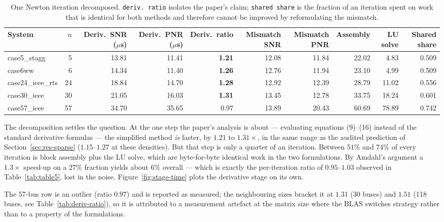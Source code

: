 \documentclass[sigconf,nonacm]{acmart}
\begin{document}
\begin{table}[t]
\centering
\caption{One Newton iteration decomposed. \texttt{deriv.\ ratio} isolates the
paper's claim; \texttt{shared share} is the fraction of an iteration spent on
work that is identical for both methods and therefore cannot be improved by
reformulating the mismatch.}
\label{tab:stages}
\small
\begin{tabular}{l r r r r r r r r r}
\toprule
System & $n$ & Deriv.\ SNR ($\mu$s) & Deriv.\ PNR ($\mu$s) & Deriv.\ ratio
& Mismatch SNR & Mismatch PNR & Assembly & LU solve & Shared share \\
\midrule
case5\_stagg      & 5  & 13.81 & 11.41 & \textbf{1.21}  & 12.08 & 11.84 & 22.02 & 4.83  & 0.509 \\
case6ww           & 6  & 14.34 & 11.40 & \textbf{1.26}  & 12.76 & 11.94 & 23.10 & 4.99  & 0.509 \\
case24\_ieee\_rts & 24 & 18.84 & 14.70 & \textbf{1.28}  & 12.92 & 12.39 & 28.79 & 11.02 & 0.556 \\
case30\_ieee      & 30 & 21.05 & 16.03 & \textbf{1.31}  & 13.45 & 12.78 & 33.75 & 18.24 & 0.601 \\
case57\_ieee      & 57 & 34.70 & 35.65 & 0.97           & 13.89 & 20.43 & 60.69 & 78.89 & 0.742 \\
\bottomrule
\end{tabular}
\end{table}

The decomposition settles the question. At the one step the paper's analysis is
about --- evaluating equations (9)--(16) instead of the standard derivative
formulas --- the simplified method \emph{is} faster, by $1.21$ to $1.31\times$,
in the same range as the audited prediction of Section~\ref{sec:res-sparse}
($1.15$--$1.27$ at these densities). But that step is only a quarter of an
iteration. Between $51\%$ and $74\%$ of every iteration is block assembly plus
the LU solve, which are byte-for-byte identical work in the two formulations.
By Amdahl's argument a $1.3\times$ speed-up on a $27\%$ fraction yields about
$6\%$ overall --- which is exactly the per-iteration ratio of $0.95$--$1.03$
observed in Table~\ref{tab:table5}, lost in the noise.
Figure~\ref{fig:stage-time} plots the derivative stage on its own.

The 57-bus row is an outlier (ratio $0.97$) and is reported as measured; the
neighbouring sizes bracket it at $1.31$ (30 buses) and $1.51$ (118 buses, see
Table~\ref{tab:deriv-ratio}), so it is attributed to a measurement artefact at
the matrix size where the BLAS switches strategy rather than to a property of
the formulations.
\end{document}
